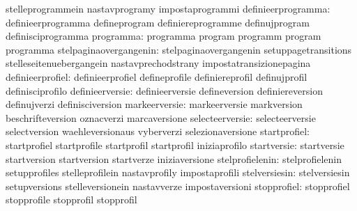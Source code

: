                                   stelleprogrammein                nastavprogramy
                                  impostaprogrammi
              definieerprogramma: definieerprogramma               defineprogram
                                  definiereprogramme               definujprogram
                                  definisciprogramma
                       programma: programma                        program
                                  programm                         program
                                  programma
          stelpaginaovergangenin: stelpaginaovergangenin           setuppagetransitions
                                  stelleseitenuebergangein         nastavprechodstrany
                                  impostatransizionepagina
                definieerprofiel: definieerprofiel                 defineprofile
                                  definiereprofil                  definujprofil
                                  definisciprofilo
                 definieerversie: definieerversie                  defineversion
                                  definiereversion                 definujverzi
                                  definisciversion
                   markeerversie: markeerversie                    markversion
                                  beschrifteversion                oznacverzi
                                  marcaversione                    %
                 selecteerversie: selecteerversie                  selectversion
                                  waehleversionaus                 vyberverzi
                                  selezionaversione                %
                    startprofiel: startprofiel                     startprofile
                                  startprofil                      startprofil
                                  iniziaprofilo
                     startversie: startversie                      startversion
                                  startversion                     startverze
                                  iniziaversione
                 stelprofielenin: stelprofielenin                  setupprofiles
                                  stelleprofilein                  nastavprofily
                                  impostaprofili
                   stelversiesin: stelversiesin                    setupversions
                                  stelleversionein                 nastavverze
                                  impostaversioni
                     stopprofiel: stopprofiel                      stopprofile
                                  stopprofil                       stopprofil
